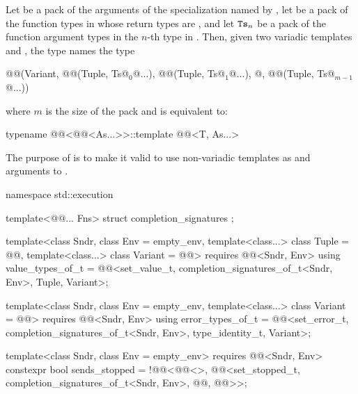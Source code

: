 \pnum
Let  be a pack of the arguments of
the  specialization named by ,
let  be a pack of the function types in 
whose return types are , and
let $\texttt{\protect Ts}_n$ be a pack of the function argument types
in the $n$-th type in .
Then, given two variadic templates  and ,
the type 
names the type
\begin{codeblock}
@@(Variant, @@(Tuple, Ts@$_0$@...),
                    @\itcorr[1]@(Tuple, Ts@$_1$@...),
                    @\itcorr[1]\ldots@,
                    @\itcorr[1]@(Tuple, Ts@$_{m-1}$@...))
\end{codeblock}
where $m$ is the size of the pack  and
 is equivalent to:
\begin{codeblock}
typename @@<@@<As...>>::template @@<T, As...>
\end{codeblock}

\pnum
\begin{note}
The purpose of  is to make it valid
to use non-variadic templates as  and  arguments
to .
\end{note}

\pnum
\begin{codeblock}
namespace std::execution {
  template<@@... Fns>
    struct completion_signatures {};

  template<class Sndr,
           class Env = empty_env,
           template<class...> class Tuple = @@,
           template<class...> class Variant = @@>
      requires @@<Sndr, Env>
    using value_types_of_t =
      @@<set_value_t, completion_signatures_of_t<Sndr, Env>, Tuple, Variant>;

  template<class Sndr,
           class Env = empty_env,
           template<class...> class Variant = @@>
      requires @@<Sndr, Env>
    using error_types_of_t =
      @@<set_error_t, completion_signatures_of_t<Sndr, Env>,
                        type_identity_t, Variant>;

  template<class Sndr, class Env = empty_env>
      requires @@<Sndr, Env>
    constexpr bool sends_stopped =
      !@@<@@<>,
               @@<set_stopped_t, completion_signatures_of_t<Sndr, Env>,
                                 @@, @@>>;
}
\end{codeblock}

